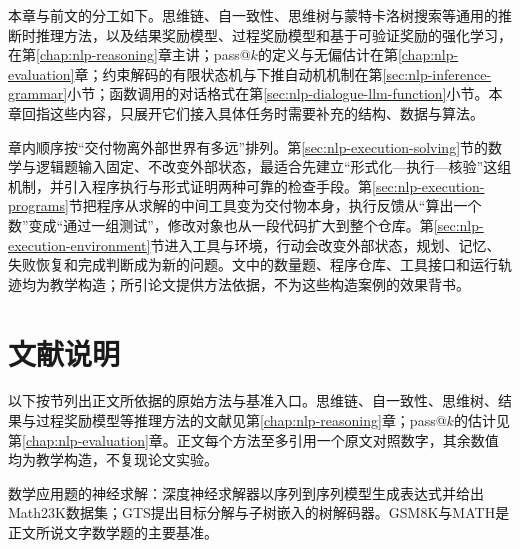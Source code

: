 本章与前文的分工如下。思维链、自一致性、思维树与蒙特卡洛树搜索等通用的推断时推理方法，以及结果奖励模型、过程奖励模型和基于可验证奖励的强化学习，在第\ref{chap:nlp-reasoning}章主讲；pass@$k$的定义与无偏估计在第\ref{chap:nlp-evaluation}章；约束解码的有限状态机与下推自动机机制在第\ref{sec:nlp-inference-grammar}小节；函数调用的对话格式在第\ref{sec:nlp-dialogue-llm-function}小节。本章回指这些内容，只展开它们接入具体任务时需要补充的结构、数据与算法。

章内顺序按“交付物离外部世界有多远”排列。第\ref{sec:nlp-execution-solving}节的数学与逻辑题输入固定、不改变外部状态，最适合先建立“形式化—执行—核验”这组机制，并引入程序执行与形式证明两种可靠的检查手段。第\ref{sec:nlp-execution-programs}节把程序从求解的中间工具变为交付物本身，执行反馈从“算出一个数”变成“通过一组测试”，修改对象也从一段代码扩大到整个仓库。第\ref{sec:nlp-execution-environment}节进入工具与环境，行动会改变外部状态，规划、记忆、失败恢复和完成判断成为新的问题。文中的数量题、程序仓库、工具接口和运行轨迹均为教学构造；所引论文提供方法依据，不为这些构造案例的效果背书。





\section*{文献说明}
\label{sec:nlp-execution-literature}

以下按节列出正文所依据的原始方法与基准入口。思维链、自一致性、思维树、结果与过程奖励模型等推理方法的文献见第\ref{chap:nlp-reasoning}章；pass@$k$的估计见第\ref{chap:nlp-evaluation}章。正文每个方法至多引用一个原文对照数字，其余数值均为教学构造，不复现论文实验。

\begin{fullwidth}
数学应用题的神经求解：深度神经求解器以序列到序列模型生成表达式并给出Math23K数据集；GTS提出目标分解与子树嵌入的树解码器。GSM8K与MATH是正文所说文字数学题的主要基准。
\par{}
\par{}
\par{}
\par{}
\end{fullwidth}


